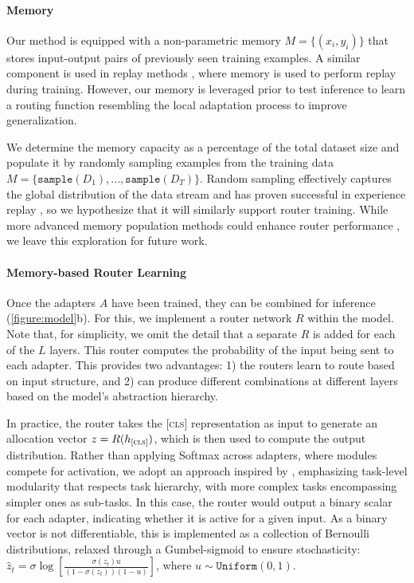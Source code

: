 \documentclass[11pt]{article}
\begin{document}
\paragraph{Memory}

Our method is equipped with a non-parametric memory $M = \{(x_i,y_i)\}$ that stores input-output pairs of previously seen training examples. A similar component is used in replay methods \cite{NEURIPS2019_f8d2e80c}, where memory is used to perform replay during training. 
However, our memory is leveraged prior to test inference to learn a routing function resembling the local adaptation process to improve generalization. 

We determine the memory capacity as a percentage of the total dataset size and populate it by randomly sampling examples from the training data $ M = \{\texttt{sample}(D_1), ..., \texttt{sample}(D_T) \} $. 
Random sampling effectively captures the global distribution of the data stream and has proven successful in experience replay \cite{araujo-etal-2022-relevant}, so we hypothesize that it will similarly support router training.
While more advanced memory population methods could enhance router performance \cite{Hurtado_2023_ICCV,hayes2021selective}, we leave this exploration for future work.

\paragraph{Memory-based Router Learning}

Once the adapters $A$ have been trained, they can be combined for inference (\autoref{figure:model}b). For this, we implement a router network $R$ within the model. Note that, for simplicity, we omit the detail that a separate $R$ is added for each of the $L$ layers.
This router computes the probability of the input being sent to each adapter.
This provides two advantages: 1) the routers learn to route based on input structure, and 2) can produce different combinations at different layers based on the model's abstraction hierarchy.

In practice, the router takes the [\textsc{cls}] representation as input to generate an allocation vector $z = R(h_{[\textsc{cls}]})$, which is then used to compute the output distribution. Rather than applying Softmax across adapters, where modules compete for activation, we adopt an approach inspired by \citet{ponti-etal-2023-combining}, emphasizing task-level modularity that respects task hierarchy, with more complex tasks encompassing simpler ones as sub-tasks. In this case, the router would output a binary scalar for each adapter, indicating whether it is active for a given input. As a binary vector is not differentiable, this is implemented as a collection of Bernoulli distributions, relaxed through a Gumbel-sigmoid to ensure stochasticity: $\hat{z}_{t} = \sigma \log \left[ \frac{\sigma(z_t) u}{(1 - \sigma(z_t)) (1 - u)} \right]$, where $u \sim \texttt{Uniform}(0,1)$.
\end{document}
